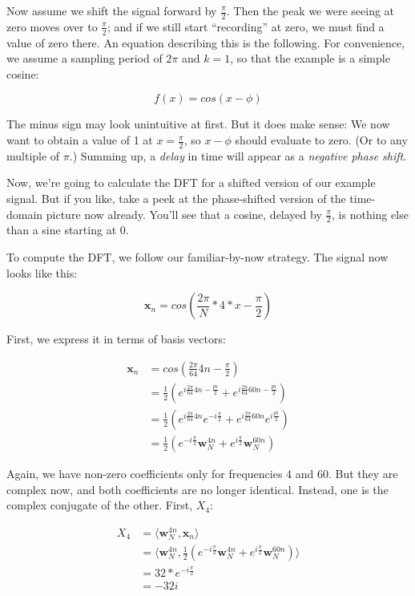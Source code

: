 \documentclass[
  letterpaper,
]{krantz}
\begin{document}
Now assume we shift the signal forward by \(\frac{\pi}{2}\). Then the
peak we were seeing at zero moves over to \(\frac{\pi}{2}\); and if we
still start ``recording'' at zero, we must find a value of zero there.
An equation describing this is the following. For convenience, we assume
a sampling period of \(2 \pi\) and \(k=1\), so that the example is a
simple cosine:

\[
f(x) = cos(x - \phi)
\]

The minus sign may look unintuitive at first. But it does make sense: We
now want to obtain a value of 1 at \(x=\frac{\pi}{2}\), so \(x - \phi\)
should evaluate to zero. (Or to any multiple of \(\pi\).) Summing up, a
\emph{delay} in time will appear as a \emph{negative phase shift}.

Now, we're going to calculate the DFT for a shifted version of our
example signal. But if you like, take a peek at the phase-shifted
version of the time-domain picture now already. You'll see that a
cosine, delayed by \(\frac{\pi}{2}\), is nothing else than a sine
starting at 0.

To compute the DFT, we follow our familiar-by-now strategy. The signal
now looks like this:

\[
\mathbf{x}_n = cos(\frac{2 \pi}{N}*4*x - \frac{\pi}{2})
\]

First, we express it in terms of basis vectors:

\[
\begin{aligned}
\mathbf{x}_n &= cos(\frac{2 \pi}{64} 4 n - \frac{\pi}{2}) \\
&= \frac{1}{2} (e^{i\frac{2 \pi}{64} 4n - \frac{pi}{2}} + e^{i\frac{2 \pi}{64} 60n - \frac{pi}{2}}) \\
&= \frac{1}{2} (e^{i\frac{2 \pi}{64} 4n}  e^{-i \frac{\pi}{2}} + e^{i\frac{2 \pi}{64} 60n}  e^{i\frac{pi}{2}}) \\
&= \frac{1}{2} (e^{-i \frac{\pi}{2}} \mathbf{w}^{4n}_N + e^{i \frac{\pi}{2}} \mathbf{w}^{60n}_N)
\end{aligned}
\]

Again, we have non-zero coefficients only for frequencies \(4\) and
\(60\). But they are complex now, and both coefficients are no longer
identical. Instead, one is the complex conjugate of the other. First,
\(X_4\):

\[
\begin{aligned}
X_4 &= \langle \mathbf{w}^{4n}_N, \mathbf{x}_n \rangle \\
&=\langle \mathbf{w}^{4n}_N, \frac{1}{2} (e^{-i \frac{\pi}{2}} \mathbf{w}^{4n}_N + e^{i \frac{\pi}{2}} \mathbf{w}^{60n}_N) \rangle\\
&= 32 *e^{-i \frac{\pi}{2}} \\
&= -32i
\end{aligned}
\]
\end{document}
